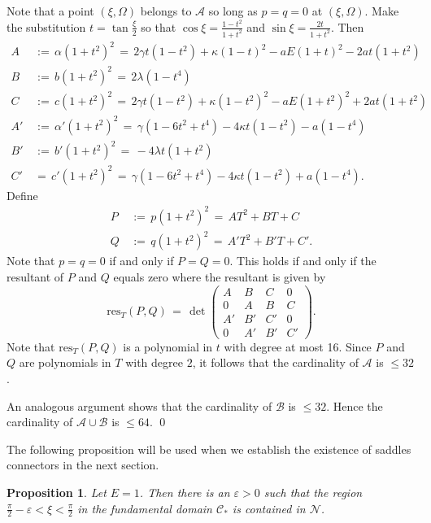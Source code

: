\documentclass[11 pt]{article}
\newtheorem{prop}[thm]{Proposition}%
\renewcommand\l{\lambda}
\renewcommand\({\left(}
\renewcommand\){\right)}
\newcommand\e{\varepsilon}
\newcommand\<{\langle}
\renewcommand\>{\rangle}
\renewcommand\l{\lambda}
\newcommand\g{\gamma}
\newcommand\8{\infty}
\renewcommand\a{\alpha}
\newcommand{\mc}{\mathcal}
\begin{document}
Note that a point $(\xi, \Omega)$ belongs to $\mc{A}$ so long as $p = q = 0$ at $(\xi, \Omega)$. Make the substitution $t = \tan\frac{\xi}{2}$ so that $\cos\xi = \frac{1 - t^2}{1 + t^2}$ and $\sin \xi = \frac{2t}{1 + t^2}$. Then 
\begin{align*}
A \,&:=\, \a(1+t^2)^2 \,=\, 2\g t(1-t^2) + \kappa (1-t)^2 - aE(1 + t)^2 -2at(1+t^2)
\\
B \,&:=\, b(1+t^2)^2 \,=\, 2\l(1 - t^4)
\\
C \,&:=\, c(1+t^2)^2 \,=\, 2\gamma t(1-t^2) + \kappa(1-t^2)^2 -aE (1+t^2)^2 + 2at(1+t^2)
\\
A' \,&:=\, \a'(1+t^2)^2 \,=\, \gamma(1 - 6t^2 + t^4) -4\kappa t(1-t^2) -a(1-t^4)
\\
B' \,&:=\, b'(1+t^2)^2 \,=\,-4\lambda t(1+t^2)
\\
C' \,&=\, c'(1+t^2)^2 \,=\, \gamma(1 -6t^2 + t^4) -4\kappa t(1-t^2) + a(1-t^4).
\end{align*}
Define 
\begin{align*}
P \,&:=\, p(1+t^2)^2 \,=\, AT^2 + BT + C
\\
Q\,&:=\, q(1+t^2)^2 \,=\, A' T^2 + B' T + C'.
\end{align*} 
Note that $p = q = 0$ if and only if $P = Q =0$. This holds if and only if the resultant of $P$ and $Q$ equals zero where the resultant is given by
\[
\text{res}_T(P,Q) \,=\, \det \begin{pmatrix}
A & B & C & 0
\\
0 & A & B & C
\\
A' & B' & C' & 0
\\
 0 & A' & B' & C'
\end{pmatrix}.
\]
Note that $\text{res}_T(P,Q)$ is a polynomial in $t$ with degree at most 16. Since $P$ and $Q$ are polynomials in $T$ with degree $2$, it follows that the cardinality of $\mc{A}$ is $\leq 32$. 

An analogous argument shows that the cardinality of $\mc{B}$ is $\leq 32$. Hence the  cardinality of $\mc{A} \cup \mc{B}$ is $\leq 64$. 
\qed




\medskip
\medskip

The following proposition will be used when we establish the existence of saddles connectors in the next section.

\medskip
\medskip

\begin{prop}\label{monotone prop}
Let $E = 1$. Then there is an $\e > 0$ such that the region $\frac{\pi}{2} - \e < \xi < \frac{\pi}{2}$ in the fundamental domain $\mc{C}_*$ is contained in $\mc{N}$.
\end{prop}
\end{document}

